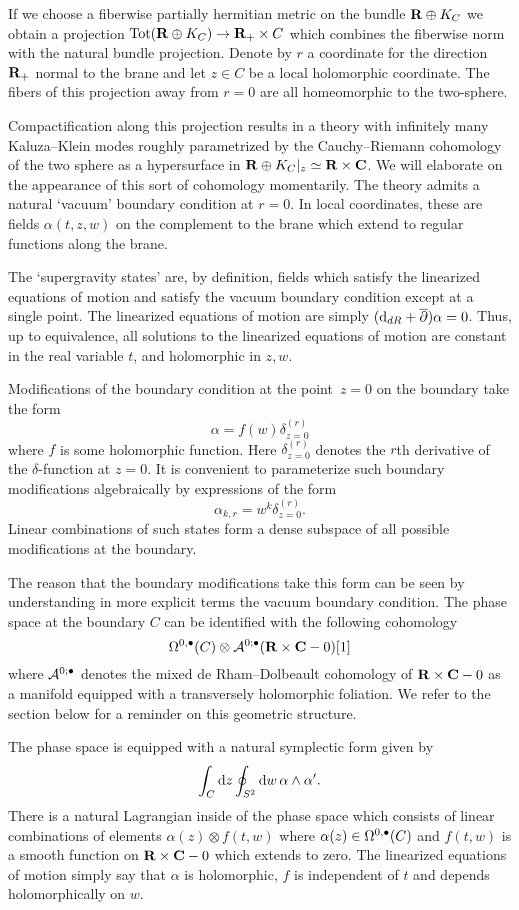 If we choose a fiberwise partially hermitian metric on the bundle $\mathbf{R} \oplus K_C$ we obtain a projection ${\rm Tot}(\mathbf{R} \oplus K_C) \to \mathbf{R}_+ \times C$ which combines the fiberwise norm with the natural bundle projection.
Denote by $r$ a coordinate for the direction $\mathbf{R}_+$ normal to the brane and let $z \in C$ be a local holomorphic coordinate.
The fibers of this projection away from $r = 0$ are all homeomorphic to the two-sphere.

Compactification along this projection results in a theory with infinitely many Kaluza--Klein modes roughly parametrized by the Cauchy--Riemann cohomology of the two sphere as a hypersurface in $\mathbf{R} \oplus K_C|_z \simeq \mathbf{R} \times \mathbf{C}$.
We will elaborate on the appearance of this sort of cohomology momentarily.
The theory admits a natural `vacuum' boundary condition at $r=0$.
In local coordinates, these are fields $\alpha(t,z,w)$ on the complement to the brane which extend to regular functions along the brane.

The `supergravity states' are, by definition, fields which satisfy the linearized equations of motion and satisfy the vacuum boundary condition except at a single point.
The linearized equations of motion are simply $({\rm d}_{dR} + \overline{\partial}) \alpha = 0$.
Thus, up to equivalence, all solutions to the linearized equations of motion are constant in the real variable $t$, and holomorphic in $z,w$.

Modifications of the boundary condition at the point~$z = 0$ on the boundary take the form
\[
\alpha = f(w) \delta^{(r)}_{z=0}
\]
where $f$ is some holomorphic function.
Here $\delta^{(r)}_{z=0}$ denotes the $r$th derivative of the $\delta$-function at $z=0$.
It is convenient to parameterize such boundary modifications algebraically by expressions of the form
\[
\alpha_{k,r} = w^k \delta^{(r)}_{z=0} .
\]
Linear combinations of such states form a dense subspace of all possible modifications at the boundary.

The reason that the boundary modifications take this form can be seen by understanding in more explicit terms the vacuum boundary condition.
The phase space at the boundary $C$ can be identified with the following cohomology
\[
\Omega^{0,\bullet}(C) \otimes \mathcal A^{0;\bullet}(\mathbf{R} \times \mathbf{C} - 0) [1]
\]
where $\mathcal A^{0;\bullet}$ denotes the mixed de Rham--Dolbeault cohomology of $\mathbf{R} \times \mathbf{C} - 0$ as a manifold equipped with a transversely holomorphic foliation.
We refer to the section below for a reminder on this geometric structure.

The phase space is equipped with a natural symplectic form given by
\[
\int_C {\rm d} z \oint_{S^2} {\rm d} w \, \alpha \wedge \alpha' .
\]
There is a natural Lagrangian inside of the phase space which consists of linear combinations of elements $\alpha(z) \otimes f(t,w)$ where $\alpha(z) \in \Omega^{0,\bullet}(C)$ and $f(t,w)$ is a smooth function on $\mathbf{R} \times \mathbf{C} - 0$ which extends to zero.
The linearized equations of motion simply say that $\alpha$ is holomorphic, $f$ is independent of $t$ and depends holomorphically on $w$.

